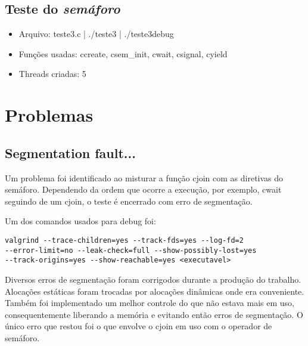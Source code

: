 \documentclass{article}
\begin{document}
\subsection{Teste do \textit{semáforo}}
\begin{itemize}
\item Arquivo: teste3.c | ./teste3 | ./teste3debug
\item Funções usadas: ccreate, csem\_init, cwait, csignal, cyield
\item Threads criadas: 5
\end{itemize}

\section{Problemas}
\subsection{Segmentation fault...}
Um problema foi identificado ao misturar a função cjoin com as diretivas do semáforo. Dependendo da ordem que ocorre a execução, por exemplo, cwait seguindo de um cjoin, o teste é encerrado com erro de segmentação.

Um dos comandos usados para debug foi:
\begin{verbatim}
valgrind --trace-children=yes --track-fds=yes --log-fd=2
--error-limit=no --leak-check=full --show-possibly-lost=yes
--track-origins=yes --show-reachable=yes <executavel>
\end{verbatim}

Diversos erros de segmentação foram corrigodos durante a produção do trabalho. Alocações estáticas foram trocadas por alocações dinâmicas onde era conveniente. Também foi implementado um melhor controle do que não estava mais em uso, consequentemente liberando a memória e evitando então erros de segmentação. O único erro que restou foi o que envolve o cjoin em uso com o operador de semáforo.
\end{document}
